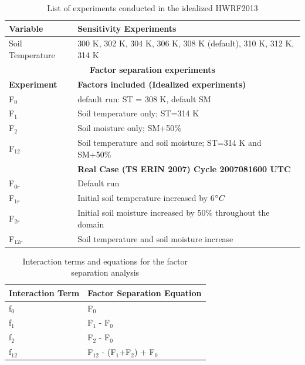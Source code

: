 \documentclass[fleqn,10pt]{wlscirep}
\begin{document}
\begin{table}[ht]
\centering
\begin{tabular}{|l|l|}
\hline
\textbf{Variable} & \textbf{Sensitivity Experiments} \\
\hline
Soil Temperature & 300 K, 302 K, 304 K, 306 K, 308 K (default), 310 K, 312 K, 314 K \\
\hline
\multicolumn{2}{c}{\textbf{Factor separation experiments}} \\
\hline
\textbf{Experiment} & \textbf{Factors included (Idealized experiments)}\\
\hline
F$_{0}$ & default run: ST = 308 K, default SM \\
\hline
F$_{1}$ & Soil temperature only; ST=314 K \\
\hline
F$_{2}$ & Soil moisture only; SM+50\% \\
\hline
F$_{12}$ & Soil temperature and soil moisture; ST=314 K and SM+50\% \\
\hline
 & \textbf{Real Case (TS ERIN 2007) Cycle 2007081600 UTC} \\
 \hline
 F$_{0r}$ & Default run \\
 \hline
 F$_{1r}$ & Initial soil temperature increased by 6$\degree{C}$ \\
 \hline
 F$_{2r}$ & Initial soil moisture increased by 50\% throughout the domain \\
 \hline
 F$_{12r}$ & Soil temperature and soil moisture increase \\
 \hline
\end{tabular}
\caption{List of experiments conducted in the idealized HWRF2013}
\label{tab:exp_list}
\end{table}

\begin{table}[ht]
\centering
\begin{tabular}{|l|l|}
\hline
\textbf{Interaction Term} & \textbf{Factor Separation Equation} \\
\hline
f$_{0}$ & F$_{0}$ \\
\hline
f$_{1}$ & F$_{1}$ - F$_{0}$ \\
\hline
f$_{2}$ & F$_{2}$ - F$_{0}$ \\
\hline
f$_{12}$ & F$_{12}$ - (F$_{1}$+F$_{2}$) + F$_{0}$ \\
\hline
\end{tabular}
\caption{Interaction terms and equations for the factor separation analysis}
\label{tab:facsep}
\end{table}
\end{document}
